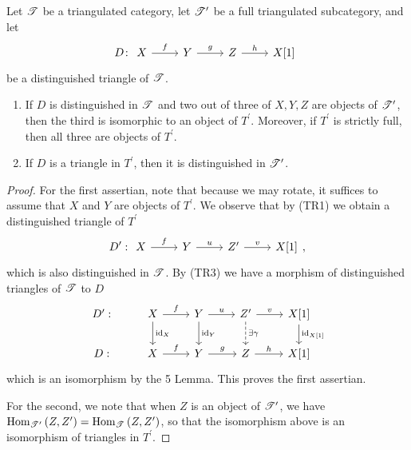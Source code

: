 \documentclass[dissertation.tex]{subfiles}
\begin{document}
\begin{prop}\label{fulltriangles}
  Let $\mathscr{T}$ be a triangulated category, let $\mathscr{T}^\prime$ be a full triangulated subcategory, and let 
  $$D\colon 
  \begin{tikzcd}
    X \arrow{r}{f} & Y \arrow{r}{g} & Z \arrow{r}{h} & X[1] 
  \end{tikzcd}$$
  be a distinguished triangle of $\mathscr{T}$.
  \begin{enumerate}
  \item
    If $D$ is distinguished in $\mathscr{T}$ and two out of three of $X,Y,Z$ are objects of $\mathscr{T}^\prime$, then the third is isomorphic to an object of $T^\prime$.
    Moreover, if $T^\prime$ is strictly full, then all three are objects of $T^\prime$.
  \item
    If $D$ is a triangle in $T^\prime$, then it is distinguished in $\mathscr{T}^\prime$.
  \end{enumerate}

  \begin{proof}
    For the first assertian, note that because we may rotate, it suffices to assume that $X$ and $Y$ are objects of $T^\prime$.
    We observe that by (TR1) we obtain a distinguished triangle of $T^\prime$ 
    $$D^\prime : 
    \begin{tikzcd}
      X \arrow{r}{f} & Y\arrow{r}{u} & Z^\prime \arrow{r}{v} & X[1]
    \end{tikzcd},$$
    which is also distinguished in $\mathscr{T}$.
    By (TR3) we have a morphism of distinguished triangles of $\mathscr{T}$ to $D$
    $$\begin{tikzcd}
      D^\prime: & X \arrow{d}{\id_X}\arrow{r}{f} & Y \arrow{d}{\id_Y}\arrow{r}{u} & Z^\prime \arrow[dashed]{d}{\exists \gamma}\arrow{r}{v} & X[1]\arrow{d}{\id_{X[1]}}\\
      D: & X \arrow{r}{f} & Y \arrow{r}{g} & Z \arrow{r}{h} & X[1]
    \end{tikzcd}$$
    which is an isomorphism by the 5 Lemma.
    This proves the first assertian.
    
    For the second, we note that when $Z$ is an object of $\mathscr{T}^\prime$, we have $\operatorname{Hom}_{\mathscr{T}^\prime}\left(Z,Z^\prime\right) = \operatorname{Hom}_{\mathscr{T}}\left(Z,Z^\prime\right)$, so that the isomorphism above is an isomorphism of triangles in $T^\prime$.
  \end{proof}
\end{prop}
\end{document}
